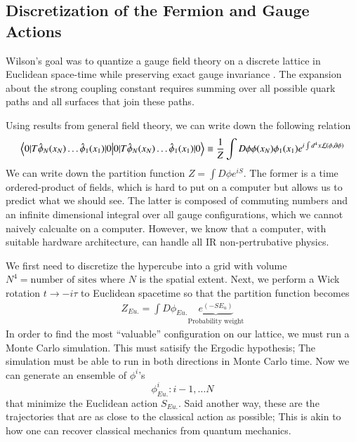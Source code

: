 \subsection{Discretization of the Fermion and Gauge Actions}
Wilson's goal was to quantize a gauge field theory on a discrete lattice in Euclidean space-time while preserving exact gauge invariance \cite{Wilson:1974sk}. The expansion about the strong coupling constant requires summing over all possible quark paths and all surfaces that join these paths.  

Using results from general field theory, we can write down the following relation 
\begin{align}
    \braket{0|T{\hat{\phi}_N(x_N)\dots \hat{\phi}_1}(x_1)|0} \equiv\frac{1}{Z} \int D\phi\phi(x_N)\phi_1(x_1)e^{i\int d^4x\mathcal{L}(\phi,\partial\phi)}
\end{align}
We can write down the partition function $Z = \int D\phi e^{iS}$. 
The former is a time ordered-product of fields, which is hard to put on a computer but allows us to predict what we should see. The latter is composed of commuting numbers and an infinite dimensional integral over all gauge configurations, which we cannot naively calcualte on a computer. However, we know that a computer, with suitable hardware architecture, can handle all IR non-pertrubative physics.   

We first need to discretize the hypercube into a grid with volume $N^4 = \text{number of sites}$ where $N$ is the spatial extent. Next, we perform a Wick rotation $t\rightarrow -i\tau$ to Euclidean spacetime so that the partition function becomes 
\begin{align}
    Z_{Eu.} = \int D\phi_{Eu.}\underbrace{e^{(-SE_u)}}_\text{Probability weight} 
\end{align} 
In order to find the most ``valuable'' configuration on our lattice, we must run a Monte Carlo simulation. This must satisify the Ergodic hypothesis; The simulation must be able to run in both directions in Monte Carlo time. Now we can generate an ensemble of $\phi^i$'s 
\begin{equation}
    {\phi_{Eu.}^i: i-1,\dots N} 
\end{equation} that minimize the Euclidean action $S_{Eu.}$. Said another way, these are the trajectories that are as close to the classical action as possible; This is akin to how one can recover classical mechanics from quantum mechanics. 

